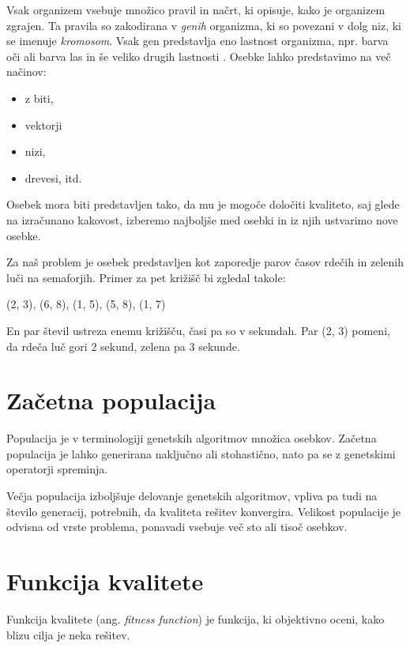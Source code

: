 \documentclass[a4paper, 12pt]{book}
\begin{document}
Vsak organizem vsebuje mno\v zico pravil in na\v crt, ki opisuje, kako je organizem zgrajen. Ta pravila so zakodirana v \textit{genih} organizma, ki so povezani v dolg niz, ki se imenuje \textit{kromosom}. Vsak gen predstavlja eno lastnost organizma, npr. barva o\v ci ali barva las in \v se veliko drugih lastnosti
\cite{aijunkie}. Osebke lahko predstavimo na ve\v c na\v cinov:

\begin{itemize} \itemsep0em
\item z biti,
\item vektorji
\item nizi,
\item drevesi, itd.
\end{itemize}

Osebek mora biti predstavljen tako, da mu je mogo\v ce dolo\v citi kvaliteto, saj glede na izra\v cunano kakovost, izberemo najbolj\v se med osebki in iz njih ustvarimo nove osebke.

Za na\v s problem je osebek predstavljen kot zaporedje parov \v casov rde\v cih in zelenih lu\v ci na semaforjih. Primer za pet kri\v zi\v s\v c bi zgledal takole:
\begin{center}
(2, 3), (6, 8), (1, 5), (5, 8), (1, 7)
\end{center}

En par \v stevil ustreza enemu kri\v zi\v s\v cu, \v casi pa so v sekundah. Par (2, 3) pomeni, da rde\v ca lu\v c gori 2 sekund, zelena pa 3 sekunde.

\section{Za\v cetna populacija}
Populacija je v terminologiji genetskih algoritmov mno\v zica osebkov. Za\v cetna populacija je lahko generirana naklju\v cno ali stohasti\v cno, nato pa se z genetskimi operatorji spreminja.

Ve\v cja populacija izbolj\v suje delovanje genetskih algoritmov, vpliva pa tudi na \v stevilo generacij, potrebnih, da kvaliteta re\v sitev konvergira. Velikost populacije je odvisna od vrste problema, ponavadi vsebuje ve\v c sto ali tiso\v c osebkov.

\section{Funkcija kvalitete}
Funkcija kvalitete (ang. \textit{fitness function}) je funkcija, ki objektivno oceni, kako blizu cilja je neka re\v sitev.
\end{document}
